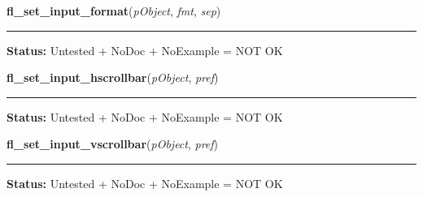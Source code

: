     \label{xformslib:library:fl_set_input_format}

    \vspace{0.5ex}

\hspace{.8\funcindent}\begin{boxedminipage}{\funcwidth}

    \raggedright \textbf{fl\_set\_input\_format}(\textit{pObject}, \textit{fmt}, \textit{sep})

    \vspace{-1.5ex}

    \rule{\textwidth}{0.5\fboxrule}
\setlength{\parskip}{2ex}
\setlength{\parskip}{1ex}
\textbf{Status:} Untested + NoDoc + NoExample = NOT OK



    \end{boxedminipage}

    \label{xformslib:library:fl_set_input_hscrollbar}

    \vspace{0.5ex}

\hspace{.8\funcindent}\begin{boxedminipage}{\funcwidth}

    \raggedright \textbf{fl\_set\_input\_hscrollbar}(\textit{pObject}, \textit{pref})

    \vspace{-1.5ex}

    \rule{\textwidth}{0.5\fboxrule}
\setlength{\parskip}{2ex}
\setlength{\parskip}{1ex}
\textbf{Status:} Untested + NoDoc + NoExample = NOT OK



    \end{boxedminipage}

    \label{xformslib:library:fl_set_input_vscrollbar}

    \vspace{0.5ex}

\hspace{.8\funcindent}\begin{boxedminipage}{\funcwidth}

    \raggedright \textbf{fl\_set\_input\_vscrollbar}(\textit{pObject}, \textit{pref})

    \vspace{-1.5ex}

    \rule{\textwidth}{0.5\fboxrule}
\setlength{\parskip}{2ex}
\setlength{\parskip}{1ex}
\textbf{Status:} Untested + NoDoc + NoExample = NOT OK



    \end{boxedminipage}

